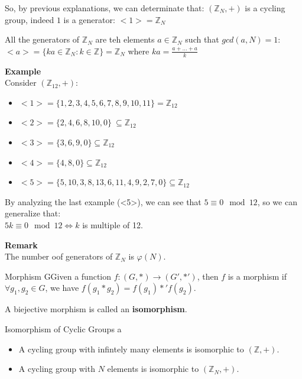\vspace{0.5 cm}

\noindent
So, by previous explanations, we can determinate that: $(\mathbb{Z}_N, +)$ is a cycling group, indeed $1$ is a generator: $<1> = \mathbb{Z}_N$
\smallskip

\noindent
All the generators of $\mathbb{Z}_N$ are teh elements $a \in \mathbb{Z}_N$ such that $gcd(a,N) = 1$:\\
$<a> = \{ ka \in  \mathbb{Z}_N : k \in \mathbb{Z} \} = \mathbb{Z}_N$ where $ka = \frac{a+...+a}{k}$

\medskip

\noindent
\textbf{Example}\\
Consider $ (\mathbb{Z}_{12}, +)$:

\begin{itemize}
    \item $<1> = \{ 1, 2, 3, 4, 5, 6, 7, 8, 9, 10, 11\} = \mathbb{Z}_{12}$
    \item $<2> = \{ 2, 4, 6, 8, 10, 0\} \	\subseteq \mathbb{Z}_{12}$
    \item $<3> = \{ 3, 6, 9, 0\} \subseteq \mathbb{Z}_{12}$
    \item $<4> = \{ 4, 8, 0\} \subseteq \mathbb{Z}_{12}$
    \item $<5> = \{ 5, 10, 3, 8, 13, 6, 11, 4, 9, 2, 7, 0   \} \subseteq \mathbb{Z}_{12}$   
\end{itemize}
\noindent
By analyzing the last example (<5>), we can see that $5 \equiv 0 \mod 12$, so we can generalize that:\\
$5k \equiv 0 \mod 12 \iff k$ is multiple of 12.
\bigskip

\noindent
\textbf{Remark}\\
The number oof generators of $\mathbb{Z}_N$ is $\varphi(N)$.

\begin{defBox}{Morphism}
    GGiven a function $f: (G, *) \to (G', *')$, then $f$ is a morphism if $\forall g_1, g_2 \in G$, we have $f(g_1 * g_2) = f(g_1) *' f(g_2)$.
\end{defBox}

\noindent
A biejective morphism is called an \textbf{isomorphism}.

\begin{thmBox}{Isomorphism of Cyclic Groups}
    a\begin{itemize}
        \item A cycling group with infintely many elements is isomorphic to $(\mathbb{Z}, +)$.
        \item A cycling group with $N$ elements is isomorphic to $(\mathbb{Z}_N, +)$.
    \end{itemize}
\end{thmBox}

